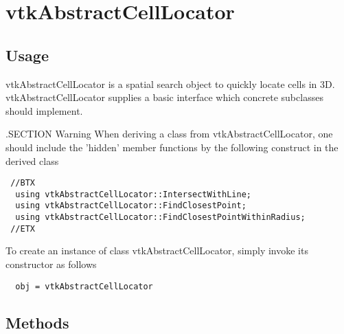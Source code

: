 \section{vtkAbstractCellLocator}

\subsection{Usage}

 vtkAbstractCellLocator is a spatial search object to quickly locate cells in 3D.
 vtkAbstractCellLocator supplies a basic interface which concrete subclasses
 should implement.

 .SECTION Warning
 When deriving a class from vtkAbstractCellLocator, one should include the 
 'hidden' member functions by the following construct in the derived class 
 \begin{verbatim}
 //BTX
  using vtkAbstractCellLocator::IntersectWithLine;
  using vtkAbstractCellLocator::FindClosestPoint;
  using vtkAbstractCellLocator::FindClosestPointWithinRadius;
 //ETX
 \end{verbatim}

To create an instance of class vtkAbstractCellLocator, simply
invoke its constructor as follows
\begin{verbatim}
  obj = vtkAbstractCellLocator
\end{verbatim}
\subsection{Methods}

